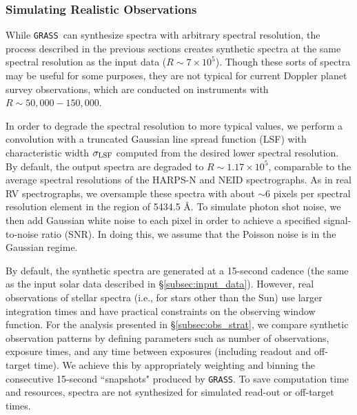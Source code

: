 \documentclass[twocolumn]{aastex63}
\newcommand{\grass}{\texttt{GRASS}}
\newcommand{\revise}[1]{#1}
\begin{document}
\subsubsection{Simulating Realistic Observations} \label{subsubsec:obs}
While \grass\ can synthesize spectra with arbitrary spectral resolution, the process described in the previous sections creates synthetic spectra at 
the same spectral resolution as the input data ($R \sim 7\times10^5$). Though these sorts of spectra may be useful for some purposes, they are not typical for current Doppler planet survey observations, which are conducted on instruments with $R \sim 50,000 - 150,000$. \par 

In order to degrade the spectral resolution to more typical values, we perform a convolution with a truncated Gaussian line spread function (LSF) with characteristic width $\sigma_{\rm LSF}$ computed from the desired lower spectral resolution. By default, the output spectra are degraded to $R \sim 1.17 \times 10^5$\revise{, comparable to the average spectral resolutions of the HARPS-N and NEID spectrographs}. As in real RV spectrographs, we oversample these spectra with about $\sim$6 pixels per spectral resolution element in the region of 5434.5 \AA. To simulate photon shot noise, we then add Gaussian white noise to each pixel in order to achieve a specified signal-to-noise ratio (SNR). In doing this, we assume that the Poisson noise is in the Gaussian regime. \par

By default, the synthetic spectra are generated at a 15-second cadence (the same as the input solar data described in \S\ref{subsec:input_data}). However, real observations of stellar spectra (i.e., for stars other than the Sun) use larger integration times and have practical constraints on the observing window function. For the analysis presented in \S\ref{subsec:obs_strat}, we compare synthetic observation patterns by defining parameters such as number of observations, exposure times, and any time between exposures (including readout and off-target time). We achieve this by appropriately weighting and binning the consecutive 15-second ``snapshots" produced by \grass. \revise{To save computation time and resources, spectra are not synthesized for simulated read-out or off-target times.} \par 

% 
\end{document}

